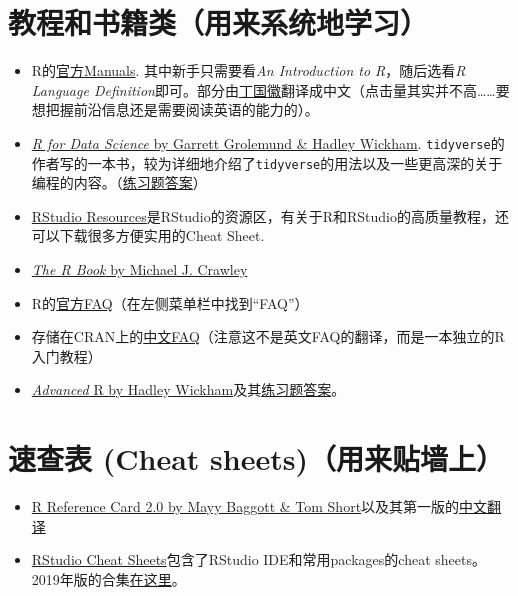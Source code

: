 \documentclass[]{book}
\providecommand{\tightlist}{%
  \setlength{\itemsep}{0pt}\setlength{\parskip}{0pt}}
\begin{document}
\section{教程和书籍类（用来系统地学习）}

\begin{itemize}
\tightlist
\item
  R的\href{https://cran.r-project.org/manuals.html}{官方Manuals}.
  其中新手只需要看\emph{An Introduction to R}，随后选看\emph{R Language Definition}即可。部分由\href{https://github.com/dingguohui}{丁国徽}翻译成中文（点击量其实并不高\ldots{}\ldots{}要想把握前沿信息还是需要阅读英语的能力的）。
\item
  \href{https://r4ds.had.co.nz}{\emph{R for Data Science} by Garrett Grolemund \& Hadley Wickham}. \texttt{tidyverse}的作者写的一本书，较为详细地介绍了\texttt{tidyverse}的用法以及一些更高深的关于编程的内容。（\href{https://jrnold.github.io/r4ds-exercise-solutions/}{练习题答案}）
\item
  \href{https://resources.rstudio.com}{RStudio Resources}是RStudio的资源区，有关于R和RStudio的高质量教程，还可以下载很多方便实用的Cheat Sheet.
\item
  \href{https://github.com/TianyiShi2001/R-Tutorial-Resorces/blob/master/资源/书籍/TheRBook.pdf}{\emph{The R Book} by Michael J. Crawley}
\item
  R的\href{https://cran.r-project.org}{官方FAQ}（在左侧菜单栏中找到``FAQ''）
\item
  存储在CRAN上的\href{https://cran.r-project.org/doc/contrib/Liu-FAQ.pdf}{中文FAQ}（注意这不是英文FAQ的翻译，而是一本独立的R入门教程）
\item
  \href{https://adv-r.hadley.nz/index.html}{\emph{Advanced} R by Hadley Wickham}及其\href{https://advanced-r-solutions.rbind.io}{练习题答案}。
\end{itemize}

\hypertarget{-cheat-sheets}{%
\section{速查表 (Cheat sheets)（用来贴墙上）}\label{-cheat-sheets}}

\begin{itemize}
\tightlist
\item
  \href{https://cran.r-project.org/doc/contrib/Baggott-refcard-v2.pdf}{R Reference Card 2.0 by Mayy Baggott \& Tom Short}以及其第一版的\href{https://cran.r-project.org/doc/contrib/Liu-R-refcard.pdf}{中文翻译}
\item
  \href{https://www.rstudio.com/resources/cheatsheets/}{RStudio Cheat Sheets}包含了RStudio IDE和常用packages的cheat sheets。2019年版的合集\href{https://www.rstudio.com/wp-content/uploads/2019/01/Cheatsheets_2019.pdf}{在这里}。
\end{itemize}
\end{document}
